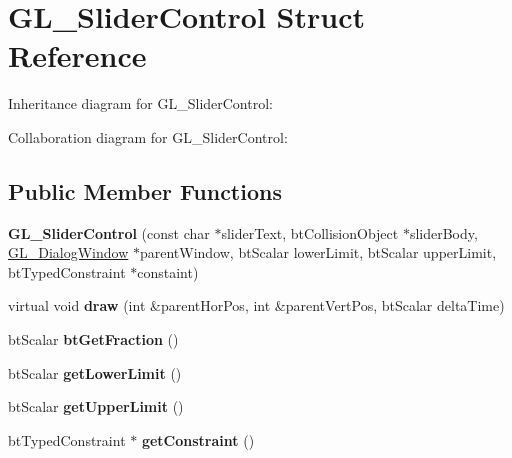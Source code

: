 \hypertarget{struct_g_l___slider_control}{\section{G\+L\+\_\+\+Slider\+Control Struct Reference}
\label{struct_g_l___slider_control}
}


Inheritance diagram for G\+L\+\_\+\+Slider\+Control\+:


Collaboration diagram for G\+L\+\_\+\+Slider\+Control\+:
\subsection*{Public Member Functions}
\begin{DoxyCompactItemize}
\item 
\hypertarget{struct_g_l___slider_control_a36cc1e021db648bc8a19131ae2466b60}{{\bfseries G\+L\+\_\+\+Slider\+Control} (const char $\ast$slider\+Text, bt\+Collision\+Object $\ast$slider\+Body, \hyperlink{class_g_l___dialog_window}{G\+L\+\_\+\+Dialog\+Window} $\ast$parent\+Window, bt\+Scalar lower\+Limit, bt\+Scalar upper\+Limit, bt\+Typed\+Constraint $\ast$constaint)}\label{struct_g_l___slider_control_a36cc1e021db648bc8a19131ae2466b60}

\item 
\hypertarget{struct_g_l___slider_control_a503638a467fee035413ceb15dea23b30}{virtual void {\bfseries draw} (int \&parent\+Hor\+Pos, int \&parent\+Vert\+Pos, bt\+Scalar delta\+Time)}\label{struct_g_l___slider_control_a503638a467fee035413ceb15dea23b30}

\item 
\hypertarget{struct_g_l___slider_control_a08be71afcafcd01cc43300373831a593}{bt\+Scalar {\bfseries bt\+Get\+Fraction} ()}\label{struct_g_l___slider_control_a08be71afcafcd01cc43300373831a593}

\item 
\hypertarget{struct_g_l___slider_control_aa6710e367d3264a45a759a9f4e2e8657}{bt\+Scalar {\bfseries get\+Lower\+Limit} ()}\label{struct_g_l___slider_control_aa6710e367d3264a45a759a9f4e2e8657}

\item 
\hypertarget{struct_g_l___slider_control_a4199b9f78d3e9420f3a713507095ae2f}{bt\+Scalar {\bfseries get\+Upper\+Limit} ()}\label{struct_g_l___slider_control_a4199b9f78d3e9420f3a713507095ae2f}

\item 
\hypertarget{struct_g_l___slider_control_af137babbdb46f7d681b9e6cdae4f789c}{bt\+Typed\+Constraint $\ast$ {\bfseries get\+Constraint} ()}\label{struct_g_l___slider_control_af137babbdb46f7d681b9e6cdae4f789c}

\end{DoxyCompactItemize}
